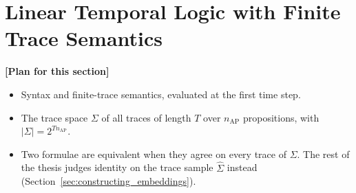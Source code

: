 \documentclass[titlepage,a4paper,11pt]{report}
\newenvironment{RSplan}{\par\medskip\color{orange!85!black}\noindent\textbf{[Plan for this section]}\par}{\par\medskip}
\begin{document}
    \section{Linear Temporal Logic with Finite Trace Semantics}\label{sec:ltlf}
    \begin{RSplan}
    \begin{itemize}
        \item Syntax and finite-trace semantics, evaluated at the first time step.
        \item The trace space $\Sigma$ of all traces of length $T$ over $n_{\text{AP}}$ propositions, with $|\Sigma|=2^{T n_{\text{AP}}}$.
        \item Two formulae are equivalent when they agree on every trace of $\Sigma$. The rest of the thesis judges identity on the trace sample $\widehat\Sigma$ instead (Section~\ref{sec:constructing_embeddings}).
    \end{itemize}
    \end{RSplan}
\end{document}
